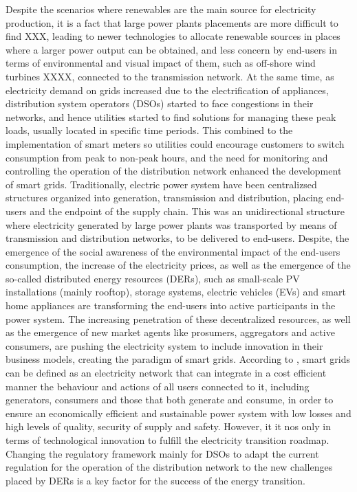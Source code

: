 Despite the scenarios where renewables are the main source for electricity production, it is a fact that large power plants placements are more difficult to find XXX, leading to newer technologies to allocate renewable sources in places where a larger power output can be obtained, and less concern by end-users in terms of environmental and visual impact of them, such as off-shore wind turbines XXXX, connected to the transmission network. At the same time, as electricity demand on grids increased due to the electrification of appliances, distribution system operators (DSOs) started to face congestions in their networks, and hence utilities started to find solutions for managing these peak loads, usually located in specific time periods.  This combined to the implementation of smart meters so utilities could encourage customers to switch consumption from peak to non-peak hours, and the need for monitoring and controlling the operation of the distribution network enhanced the development of smart grids. Traditionally, electric power system have been centralizsed structures organized into generation, transmission and distribution, placing end-users and the endpoint of the supply chain. This was an unidirectional structure where electricity generated by large power plants was transported by means of transmission and distribution networks, to be delivered to end-users. Despite, the emergence of the social awareness of the environmental impact of the end-users consumption, the increase of the electricity prices, as well as the emergence of the so-called distributed energy resources (DERs), such as small-scale PV installations (mainly rooftop), storage systems, electric vehicles (EVs) and smart home appliances are transforming the end-users into active participants in the power system. The increasing penetration of these decentralized resources, as well as the emergence of new market agents like prosumers, aggregators and active consumers, are pushing the electricity system to include innovation in their business models, creating the paradigm of smart grids. 
According to \cite{EuropeanParliamentSG}, smart grids can be defined as an electricity network that can integrate in a cost efficient manner the behaviour and actions of all users connected to it, including generators, consumers and those that both generate and consume, in order to ensure an economically efficient and sustainable power system with low losses and high levels of quality, security of supply and safety. 
However, it it nos only in terms of technological innovation to fulfill the electricity transition roadmap. Changing the regulatory framework mainly for DSOs to adapt the current regulation for the operation of the distribution network to the new challenges placed by DERs is a key factor for the success of the energy transition. 
